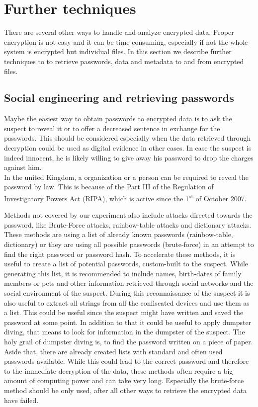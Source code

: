 \section{Further techniques}
There are several other ways to handle and analyze encrypted data. Proper encryption is not easy and it can be time-consuming, especially if not the whole system is encrypted but individual files. In this section we describe further techniques to to retrieve passwords, data and metadata to and from encrypted files.
\subsection{Social engineering and retrieving passwords}
Maybe the easiest way to obtain passwords to encrypted data is to ask the suspect to reveal it or to offer a decreased sentence in exchange for the passwords.
This should be considered especially when the data retrieved through decryption could be used as digital evidence in other cases.
In case the suspect is indeed innocent, he is likely willing to give away his password to drop the charges against him.\\
In the united Kingdom, a organization or a person can be required to reveal the password by law. This is because of the Part III of the Regulation of Investigatory Powers Act (RIPA), which is active since  the 1\textsuperscript{st} of October 2007.\cite{passwordsInUK}

Methods not covered by our experiment also include attacks directed towards the password, like Brute-Force attacks, rainbow-table attacks and dictionary attacks. These methods are using a list of already known passwords (rainbow-table, dictionary) or they are using all possible passwords (brute-force) in an attempt to find the right password or password hash.
To accelerate these methods, it is useful to create a list of potential passwords, custom-built to the suspect. While generating this list, it is recommended to include names, birth-dates of family members or pets and other information retrieved through social networks and the social environment of the suspect. During this reconnaissance of the suspect it is also useful to extract all strings from all the confiscated devices and use them as a list. This could be useful since the suspect might have written and saved the password at some point. In addition to that it could be useful to apply dumpster diving, that means to look for information in the dumpster of the suspect. 
The holy grail of dumpster diving is, to find the password written on a piece of paper. 
Aside that, there are already created lists with standard and often used passwords available.
While this could lead to the correct password and therefore to the immediate decryption of the data, these methods often require a big amount of
computing power and can take very long.
Especially the brute-force method should be only used, after all other ways to retrieve the encrypted data have failed.


